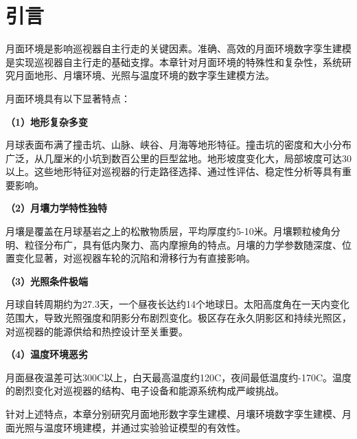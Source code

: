 \section{引言}
\label{sec:ch3_intro}

月面环境是影响巡视器自主行走的关键因素。准确、高效的月面环境数字孪生建模是实现巡视器自主行走的基础支撑。本章针对月面环境的特殊性和复杂性，系统研究月面地形、月壤环境、光照与温度环境的数字孪生建模方法。

月面环境具有以下显著特点：

\textbf{（1）地形复杂多变}

月球表面布满了撞击坑、山脉、峡谷、月海等地形特征。撞击坑的密度和大小分布广泛，从几厘米的小坑到数百公里的巨型盆地。地形坡度变化大，局部坡度可达30\degree 以上。这些地形特征对巡视器的行走路径选择、通过性评估、稳定性分析等具有重要影响。

\textbf{（2）月壤力学特性独特}

月壤是覆盖在月球基岩之上的松散物质层，平均厚度约5-10米。月壤颗粒棱角分明、粒径分布广，具有低内聚力、高内摩擦角的特点。月壤的力学参数随深度、位置变化显著，对巡视器车轮的沉陷和滑移行为有直接影响。

\textbf{（3）光照条件极端}

月球自转周期约为27.3天，一个昼夜长达约14个地球日。太阳高度角在一天内变化范围大，导致光照强度和阴影分布剧烈变化。极区存在永久阴影区和持续光照区，对巡视器的能源供给和热控设计至关重要。

\textbf{（4）温度环境恶劣}

月面昼夜温差可达300\degree C以上，白天最高温度约120\degree C，夜间最低温度约-170\degree C。温度的剧烈变化对巡视器的结构、电子设备和能源系统构成严峻挑战。

针对上述特点，本章分别研究月面地形数字孪生建模、月壤环境数字孪生建模、月面光照与温度环境建模，并通过实验验证模型的有效性。
